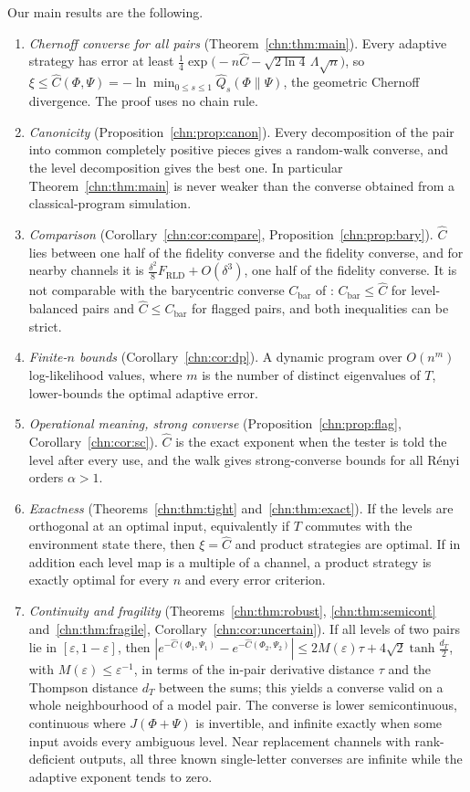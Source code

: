 Our main results are the following.
\begin{enumerate}
\item \emph{Chernoff converse for all pairs} (Theorem~\ref{chn:thm:main}). Every adaptive strategy has error at least $\tfrac14\exp\big(-n\widehat C-\sqrt{2\ln4}\,\Lambda\sqrt n\big)$, so $\xi\le\widehat C(\Phi,\Psi)=-\ln\min_{0\le s\le1}\widehat Q_s(\Phi\|\Psi)$, the geometric Chernoff divergence. The proof uses no chain rule.
\item \emph{Canonicity} (Proposition~\ref{chn:prop:canon}). Every decomposition of the pair into common completely positive pieces gives a random-walk converse, and the level decomposition gives the best one. In particular Theorem~\ref{chn:thm:main} is never weaker than the converse obtained from a classical-program simulation.
\item \emph{Comparison} (Corollary~\ref{chn:cor:compare}, Proposition~\ref{chn:prop:bary}). $\widehat C$ lies between one half of the fidelity converse and the fidelity converse, and for nearby channels it is $\frac{\delta^2}{8}F_{\mathrm{RLD}}+O(\delta^3)$, one half of the fidelity converse. It is not comparable with the barycentric converse $C_{\mathrm{bar}}$ of \cite{JMMW2024}: $C_{\mathrm{bar}}\le\widehat C$ for level-balanced pairs and $\widehat C\le C_{\mathrm{bar}}$ for flagged pairs, and both inequalities can be strict.
\item \emph{Finite-$n$ bounds} (Corollary~\ref{chn:cor:dp}). A dynamic program over $O(n^m)$ log-likelihood values, where $m$ is the number of distinct eigenvalues of $T$, lower-bounds the optimal adaptive error.
\item \emph{Operational meaning, strong converse} (Proposition~\ref{chn:prop:flag}, Corollary~\ref{chn:cor:sc}). $\widehat C$ is the exact exponent when the tester is told the level after every use, and the walk gives strong-converse bounds for all R\'enyi orders $\alpha>1$.
\item \emph{Exactness} (Theorems~\ref{chn:thm:tight} and~\ref{chn:thm:exact}). If the levels are orthogonal at an optimal input, equivalently if $T$ commutes with the environment state there, then $\xi=\widehat C$ and product strategies are optimal. If in addition each level map is a multiple of a channel, a product strategy is exactly optimal for every $n$ and every error criterion.
\item \emph{Continuity and fragility} (Theorems~\ref{chn:thm:robust}, \ref{chn:thm:semicont} and~\ref{chn:thm:fragile}, Corollary~\ref{chn:cor:uncertain}). If all levels of two pairs lie in $[\varepsilon,1-\varepsilon]$, then $|e^{-\widehat C(\Phi_1,\Psi_1)}-e^{-\widehat C(\Phi_2,\Psi_2)}|\le2M(\varepsilon)\tau+4\sqrt2\tanh\frac{d_T}2$, with $M(\varepsilon)\le\varepsilon^{-1}$, in terms of the in-pair derivative distance $\tau$ and the Thompson distance $d_T$ between the sums; this yields a converse valid on a whole neighbourhood of a model pair. The converse is lower semicontinuous, continuous where $J(\Phi+\Psi)$ is invertible, and infinite exactly when some input avoids every ambiguous level. Near replacement channels with rank-deficient outputs, all three known single-letter converses are infinite while the adaptive exponent tends to zero.

\end{enumerate}
